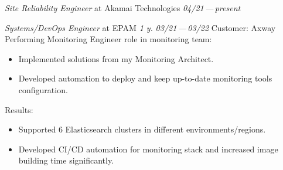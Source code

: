 \documentclass[11pt]{letter}
\newcommand{\forceindent}{\leavevmode{\parindent=1em\indent} %
}
\begin{document}
\begin{etaremune}[
  topsep=1ex,itemsep=1.5ex,partopsep=0ex,
  parsep=0ex,rightmargin=1em,leftmargin=2em
]
  \item
    \emph{Site Reliability Engineer}\hfill
    at Akamai Technologies\hspace{10em}
    \textit{04/21\,—\,present}\vspace{1em}\newline
  \item
    \emph{Systems/DevOps Engineer}\hfill
    at EPAM\hspace{8em}
    \textit{1 y.}\hspace{5em}
    \textit{03/21\,—\,03/22}\vspace{1em}\newline
    \forceindent Customer: Axway\vspace{0.5em}\newline
    \forceindent Performing Monitoring Engineer role in monitoring team: \begin{itemize}
        \item Implemented solutions from my Monitoring Architect. \\
        \item Developed automation to deploy and keep up-to-date monitoring tools configuration. \\
    \end{itemize}
    \forceindent Results: \begin{itemize}
        \item Supported 6 Elasticsearch clusters in different environments/regions.
        \item Developed CI/CD automation for monitoring stack and increased image building time significantly.
    \end{itemize}


\end{etaremune}
\end{document}
